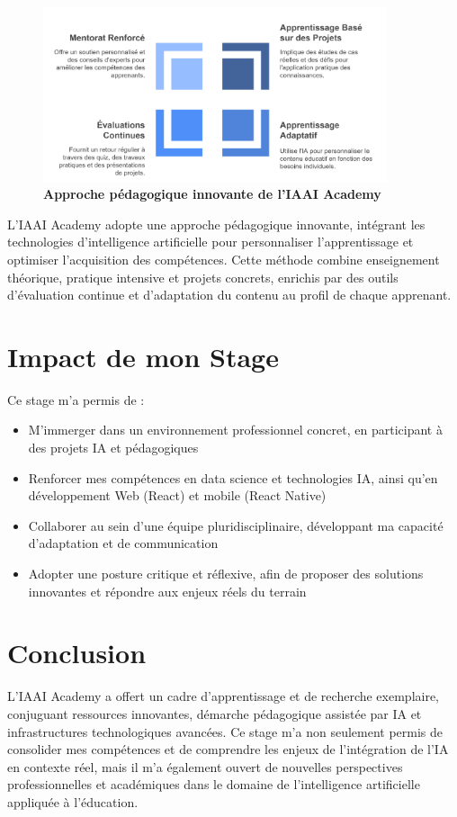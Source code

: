 \begin{figure}[H]
  \centering
  \includegraphics[width=0.9\textwidth]{images/Pedagogie.png}
  \caption{\textbf{Approche pédagogique innovante de l'IAAI Academy}}
  \label{fig:pedagogie}
\end{figure}

L'IAAI Academy adopte une approche pédagogique innovante, intégrant les technologies d'intelligence artificielle pour personnaliser l'apprentissage et optimiser l'acquisition des compétences. Cette méthode combine enseignement théorique, pratique intensive et projets concrets, enrichis par des outils d'évaluation continue et d'adaptation du contenu au profil de chaque apprenant.

\section{Impact de mon Stage}

Ce stage m'a permis de :
\begin{itemize}
  \item M'immerger dans un environnement professionnel concret, en participant à des projets IA et pédagogiques
  \item Renforcer mes compétences en data science et technologies IA, ainsi qu'en développement Web (React) et mobile (React Native)
  \item Collaborer au sein d'une équipe pluridisciplinaire, développant ma capacité d'adaptation et de communication
  \item Adopter une posture critique et réflexive, afin de proposer des solutions innovantes et répondre aux enjeux réels du terrain
\end{itemize}

\section{Conclusion}

L'IAAI Academy a offert un cadre d'apprentissage et de recherche exemplaire, conjuguant ressources innovantes, démarche pédagogique assistée par IA et infrastructures technologiques avancées. Ce stage m'a non seulement permis de consolider mes compétences et de comprendre les enjeux de l'intégration de l'IA en contexte réel, mais il m'a également ouvert de nouvelles perspectives professionnelles et académiques dans le domaine de l'intelligence artificielle appliquée à l'éducation. 